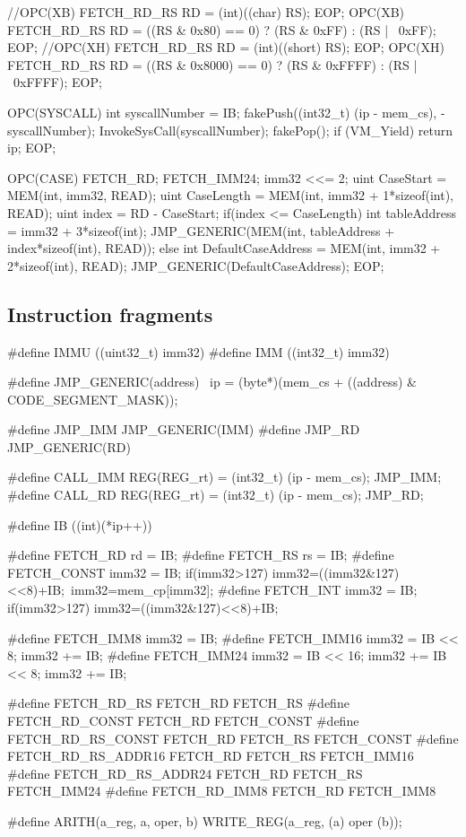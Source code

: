 \documentclass {article}
\begin{document}
\begin{verbatimtab}
//OPC(XB)		FETCH_RD_RS		RD = (int)((char) RS); EOP;
OPC(XB)	FETCH_RD_RS	RD = ((RS & 0x80) == 0) ? (RS & 0xFF) : (RS | ~0xFF); EOP;
//OPC(XH)		FETCH_RD_RS		RD = (int)((short) RS);	EOP;
OPC(XH)	FETCH_RD_RS	RD = ((RS & 0x8000) == 0) ? (RS & 0xFFFF) : (RS | ~0xFFFF); EOP;

OPC(SYSCALL)
{
	int syscallNumber = IB;
	fakePush((int32_t) (ip - mem_cs), -syscallNumber);
	InvokeSysCall(syscallNumber);
	fakePop();
	if (VM_Yield)
		return ip;
}
EOP;

OPC(CASE) FETCH_RD; FETCH_IMM24; {
	imm32 <<= 2;
	uint CaseStart = MEM(int, imm32, READ);
	uint CaseLength = MEM(int, imm32 + 1*sizeof(int), READ);
	uint index = RD - CaseStart;
	if(index <= CaseLength) {
		int tableAddress = imm32 + 3*sizeof(int);
		JMP_GENERIC(MEM(int, tableAddress + index*sizeof(int), READ));
	} else {
		int DefaultCaseAddress = MEM(int, imm32 + 2*sizeof(int), READ);
		JMP_GENERIC(DefaultCaseAddress);
	}
} EOP;

\end{verbatimtab}


\subsection{Instruction fragments}

\begin{verbatimtab}

#define IMMU ((uint32_t) imm32)
#define IMM ((int32_t) imm32)

#define JMP_GENERIC(address) \
	ip = (byte*)(mem_cs + ((address) & CODE_SEGMENT_MASK));

#define	JMP_IMM	JMP_GENERIC(IMM)
#define	JMP_RD	JMP_GENERIC(RD)

#define	CALL_IMM	REG(REG_rt) = (int32_t) (ip - mem_cs); JMP_IMM;
#define	CALL_RD	REG(REG_rt) = (int32_t) (ip - mem_cs); JMP_RD;

#define IB ((int)(*ip++))

#define FETCH_RD	rd = IB;
#define FETCH_RS	rs = IB;
#define FETCH_CONST	imm32 = IB; if(imm32>127) {imm32=((imm32&127)<<8)+IB;}\
	imm32=mem_cp[imm32];
#define FETCH_INT	imm32 = IB; if(imm32>127) {imm32=((imm32&127)<<8)+IB;}

#define FETCH_IMM8	imm32 = IB;
#define FETCH_IMM16	imm32 = IB << 8; imm32 += IB;
#define FETCH_IMM24	imm32 = IB << 16; imm32 += IB << 8; imm32 += IB;

#define FETCH_RD_RS		FETCH_RD FETCH_RS
#define FETCH_RD_CONST		FETCH_RD FETCH_CONST
#define FETCH_RD_RS_CONST	FETCH_RD FETCH_RS FETCH_CONST
#define FETCH_RD_RS_ADDR16	FETCH_RD FETCH_RS FETCH_IMM16
#define FETCH_RD_RS_ADDR24	FETCH_RD FETCH_RS FETCH_IMM24
#define FETCH_RD_IMM8		FETCH_RD FETCH_IMM8

#define ARITH(a_reg, a, oper, b) WRITE_REG(a_reg, (a) oper (b));

\end{verbatimtab}
\end{document}
